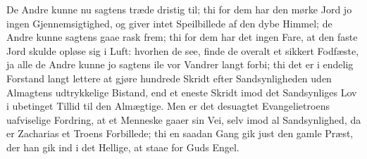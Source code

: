 \documentclass[12pt,a4paper]{book}
\begin{document}
De Andre kunne nu sagtens træde dristig til; thi for dem har den mørke
Jord jo ingen Gjennemsigtighed, og giver intet Speilbillede af den dybe
Himmel; de Andre kunne sagtens gaae rask frem; thi for dem har det ingen
Fare, at den faste Jord skulde opløse sig i Luft: hvorhen de see, finde
de overalt et sikkert Fodfæste, ja alle de Andre kunne jo sagtens ile vor
Vandrer langt forbi; thi det er i endelig Forstand langt lettere at gjøre
hundrede Skridt efter Sandsynligheden uden Almagtens udtrykkelige
Bistand, end et eneste Skridt imod det Sandsynliges Lov i ubetinget
Tillid til den Almægtige. Men er det desuagtet Evangelietroens
uafviselige Fordring, at et Menneske gaaer sin Vei, selv imod al
Sandsynlighed, da er Zacharias et Troens Forbillede; thi en saadan Gang
gik just den gamle Præst, der han gik ind i det Hellige, at staae for
Guds Engel.
\end{document}
